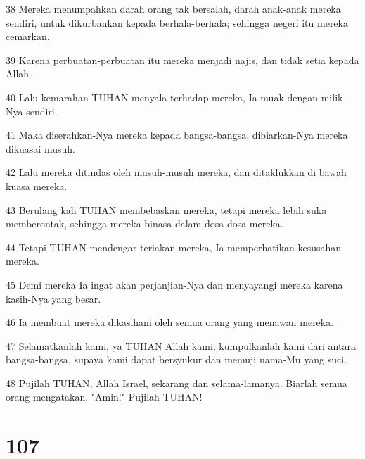 \par 38 Mereka menumpahkan darah orang tak bersalah, darah anak-anak mereka sendiri, untuk dikurbankan kepada berhala-berhala; sehingga negeri itu mereka cemarkan.
\par 39 Karena perbuatan-perbuatan itu mereka menjadi najis, dan tidak setia kepada Allah.
\par 40 Lalu kemarahan TUHAN menyala terhadap mereka, Ia muak dengan milik-Nya sendiri.
\par 41 Maka diserahkan-Nya mereka kepada bangsa-bangsa, dibiarkan-Nya mereka dikuasai musuh.
\par 42 Lalu mereka ditindas oleh musuh-musuh mereka, dan ditaklukkan di bawah kuasa mereka.
\par 43 Berulang kali TUHAN membebaskan mereka, tetapi mereka lebih suka memberontak, sehingga mereka binasa dalam dosa-dosa mereka.
\par 44 Tetapi TUHAN mendengar teriakan mereka, Ia memperhatikan kesusahan mereka.
\par 45 Demi mereka Ia ingat akan perjanjian-Nya dan menyayangi mereka karena kasih-Nya yang besar.
\par 46 Ia membuat mereka dikasihani oleh semua orang yang menawan mereka.
\par 47 Selamatkanlah kami, ya TUHAN Allah kami, kumpulkanlah kami dari antara bangsa-bangsa, supaya kami dapat bersyukur dan memuji nama-Mu yang suci.
\par 48 Pujilah TUHAN, Allah Israel, sekarang dan selama-lamanya. Biarlah semua orang mengatakan, "Amin!" Pujilah TUHAN!

\chapter{107}

